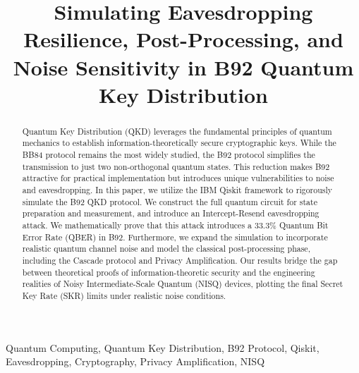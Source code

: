 \documentclass[conference]{IEEEtran}
\begin{document}
\title{Simulating Eavesdropping Resilience, Post-Processing, and Noise Sensitivity in B92 Quantum Key Distribution}

\author{
}

\maketitle

\begin{abstract}
Quantum Key Distribution (QKD) leverages the fundamental principles of quantum mechanics to establish information-theoretically secure cryptographic keys. While the BB84 protocol remains the most widely studied, the B92 protocol simplifies the transmission to just two non-orthogonal quantum states. This reduction makes B92 attractive for practical implementation but introduces unique vulnerabilities to noise and eavesdropping. In this paper, we utilize the IBM Qiskit framework to rigorously simulate the B92 QKD protocol. We construct the full quantum circuit for state preparation and measurement, and introduce an Intercept-Resend eavesdropping attack. We mathematically prove that this attack introduces a 33.3\% Quantum Bit Error Rate (QBER) in B92. Furthermore, we expand the simulation to incorporate realistic quantum channel noise and model the classical post-processing phase, including the Cascade protocol and Privacy Amplification. Our results bridge the gap between theoretical proofs of information-theoretic security and the engineering realities of Noisy Intermediate-Scale Quantum (NISQ) devices, plotting the final Secret Key Rate (SKR) limits under realistic noise conditions.

\end{abstract}

\begin{IEEEkeywords}
Quantum Computing, Quantum Key Distribution, B92 Protocol, Qiskit, Eavesdropping, Cryptography, Privacy Amplification, NISQ
\end{IEEEkeywords}
\end{document}
